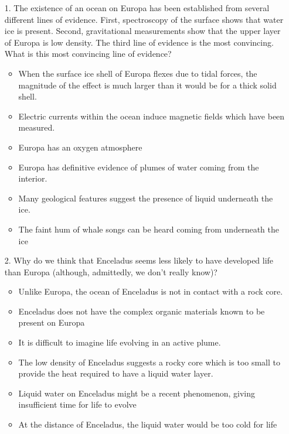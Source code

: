 \begin{enumerate}
    \item[1.] The existence of an ocean on Europa has been established from several different lines of evidence. First, spectroscopy of the surface shows that water ice is present. Second, gravitational measurements show that the upper layer of Europa is low density. The third line of evidence is the most convincing. What is this most convincing line of evidence?

\begin{itemize}[label={$\bullet$}]
    \item When the surface ice shell of Europa flexes due to tidal forces, the magnitude of the effect is much larger than it would be for a thick solid shell.
    \item Electric currents within the ocean induce magnetic fields which have been measured.
    \item Europa has an oxygen atmosphere
    \item Europa has definitive evidence of plumes of water coming from the interior.
    \item Many geological features suggest the presence of liquid underneath the ice.
    \item The faint hum of whale songs can be heard coming from underneath the ice
\end{itemize}

\item[2.] Why do we think that  Enceladus seems less likely to have developed life than Europa (although, admittedly, we don't really know)?

\begin{itemize}[label={$\bullet$}]
    \item Unlike Europa, the ocean of Enceladus is not in contact with a rock core.
    \item Enceladus does not have the complex organic materials known to be present on Europa
    \item It is difficult to imagine life evolving in an active plume.
    \item The low density of Enceladus suggests a rocky core which is too small to provide the heat required to have a liquid water layer.
    \item Liquid water on Enceladus might be a recent phenomenon, giving insufficient time for life to evolve
    \item At the distance of Enceladus, the liquid water would be too cold for life
\end{itemize}


\end{enumerate}
